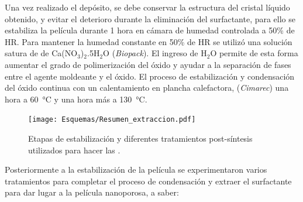 		Una vez realizado el depósito, se debe conservar la estructura del cristal líquido obtenido, y evitar el deterioro durante la eliminación del surfactante, para ello se estabiliza la película durante 1 hora en cámara de humedad controlada a 50\% de HR. Para mantener la humedad constante en 50\% de HR se utilizó una solución satura de de Ca(NO$_3$)$_2$.5H$_2$O (\textit{Biopack}). El ingreso de H$_2$O permite de esta forma aumentar el grado de polimerización del óxido y ayudar a la separación de fases entre el agente moldeante y el óxido. El proceso de estabilización y condensación del óxido continua con un calentamiento en plancha calefactora, (\textit{Cimarec}) una hora a \SI{60}{\celsius} y una hora más a \SI{130}{\celsius}\cite{Crepaldi2003,Crepaldi2002a}. 
			\begin{figure}[ht!]
						  \begin{center}
						  \texttt{[image: Esquemas/Resumen\_extraccion.pdf]}
						  \caption[Tratamientos post-síntesis de \pdm]{Etapas de estabilización y diferentes tratamientos post-síntesis utilizados para hacer las \pdm.}
						  \label{esq:peliculas_meso_tratamientos}
						  \end{center}
						  \end{figure}
		Posteriormente a la estabilización de la película se experimentaron varios tratamientos para completar el proceso de condensación y extraer el surfactante para dar lugar a la película nanoporosa, a saber:

